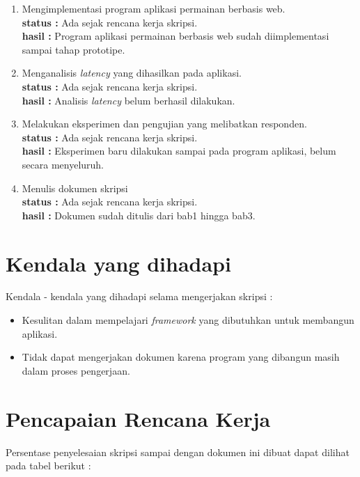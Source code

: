 \documentclass[a4paper,twoside]{article}
\begin{document}
\begin{enumerate}
		\item Mengimplementasi program aplikasi permainan berbasis web. \\
		{\bf status :} Ada sejak rencana kerja skripsi.\\
		{\bf hasil :} Program aplikasi permainan berbasis web sudah diimplementasi sampai tahap prototipe.
		

		\item Menganalisis \textit{latency} yang dihasilkan pada aplikasi.\\
		{\bf status :} Ada sejak rencana kerja skripsi.\\
		{\bf hasil :} Analisis \textit{latency} belum berhasil dilakukan.

		\item Melakukan eksperimen dan pengujian yang melibatkan responden.\\
		{\bf status :} Ada sejak rencana kerja skripsi.\\
		{\bf hasil :} Eksperimen baru dilakukan sampai pada program aplikasi, belum secara menyeluruh.

		\item Menulis dokumen skripsi\\
		{\bf status :} Ada sejak rencana kerja skripsi.\\
		{\bf hasil :} Dokumen sudah ditulis dari bab1 hingga bab3.
		

	\end{enumerate}

%


\section{Kendala yang dihadapi}
Kendala - kendala yang dihadapi selama mengerjakan skripsi :
\begin{itemize}
	\item Kesulitan dalam mempelajari \textit{framework} yang dibutuhkan untuk membangun aplikasi.
	\item Tidak dapat mengerjakan dokumen karena program yang dibangun masih dalam proses pengerjaan.
\end{itemize}

\section{Pencapaian Rencana Kerja}
Persentase penyelesaian skripsi sampai dengan dokumen ini dibuat dapat dilihat pada tabel berikut :
\end{document}
